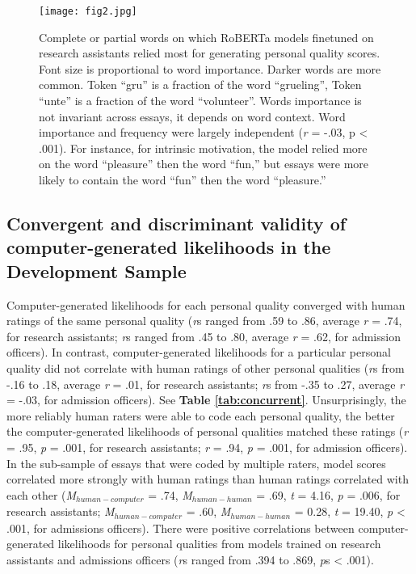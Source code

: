 \documentclass[11pt]{report}
\begin{document}
\begin{mainf}
\begin{figure}
    \centering
    \texttt{[image: fig2.jpg]}
    \caption{Complete or partial words on which RoBERTa models finetuned on research assistants relied most for generating personal quality scores. Font size is proportional to word importance.  Darker words are more common. Token ``gru'' is a fraction of the word ``grueling'', Token ``unte'' is a fraction of the word ``volunteer''. 
    Words importance is not invariant across essays, it depends on word context.
    Word importance and frequency were largely independent (\textit{r} = -.03, p < .001). For instance, for intrinsic motivation, the model relied more on the word ``pleasure'' then the word ``fun,'' but essays were more likely to contain the word ``fun'' then the word ``pleasure.''}
    \label{fig:interpret}
\end{figure}


\subsection{Convergent and discriminant validity of computer-generated likelihoods in the Development Sample}
Computer-generated likelihoods for each personal quality converged with human ratings of the same personal quality (\textit{r}s ranged from .59 to .86, average \textit{r} = .74, for research assistants; \textit{r}s ranged from .45 to .80, average \textit{r} = .62, for admission officers). In contrast, computer-generated likelihoods for a particular personal quality did not correlate with human ratings of other personal qualities (\textit{r}s from -.16 to .18, average \textit{r} = .01, for research assistants; \textit{r}s from -.35 to .27, average \textit{r} = -.03, for admission officers). See \textbf{Table \ref{tab:concurrent}}. Unsurprisingly, the more reliably human raters were able to code each personal quality, the better the computer-generated likelihoods of personal qualities matched these ratings (\textit{r} = .95, \textit{p} = .001, for research assistants; \textit{r} = .94, \textit{p} = .001, for admission officers). In the sub-sample of essays that were coded by multiple raters, model scores correlated more strongly with human ratings than human ratings correlated with each other (\textit{M}$_{human-computer}$ = .74, \textit{M}$_{human-human}$ = .69, \textit{t} = 4.16, \textit{p} = .006, for research assistants; \textit{M}$_{human-computer}$ = .60, \textit{M}$_{human-human}$ = 0.28, \textit{t} = 19.40, \textit{p} < .001, for admissions officers). There were positive correlations between computer-generated likelihoods for personal qualities from models trained on research assistants and admissions officers (\textit{r}s ranged from .394 to .869, \textit{p}s < .001).


\end{mainf}
\end{document}
